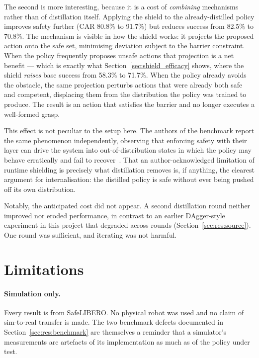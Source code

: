 \documentclass[a4paper,11pt]{report}
\begin{document}
The second is more interesting, because it is a cost of \emph{combining} mechanisms rather than of
distillation itself. Applying the shield to the already-distilled policy improves safety further
(CAR 80.8\% to 91.7\%) but reduces success from 82.5\% to 70.8\%. The mechanism is visible in how
the shield works: it projects the proposed action onto the safe set, minimising deviation subject
to the barrier constraint. When the policy frequently proposes unsafe actions that projection is a
net benefit --- which is exactly what Section~\ref{sec:shield_efficacy} shows, where the shield
\emph{raises} base success from 58.3\% to 71.7\%. When the policy already avoids the obstacle, the
same projection perturbs actions that were already both safe and competent, displacing them from
the distribution the policy was trained to produce. The result is an action that satisfies the
barrier and no longer executes a well-formed grasp.

This effect is not peculiar to the setup here. The authors of the benchmark report the same
phenomenon independently, observing that enforcing safety with their layer can drive the system
into out-of-distribution states in which the policy may behave erratically and fail to
recover~\cite{vlsa2026}. That an author-acknowledged limitation of runtime shielding is precisely
what distillation removes is, if anything, the clearest argument for internalisation: the distilled
policy is safe without ever being pushed off its own distribution.

Notably, the anticipated cost did not appear. A second distillation round neither improved nor
eroded performance, in contrast to an earlier DAgger-style experiment in this project that degraded
across rounds (Section~\ref{sec:res:source}). One round was sufficient, and iterating was not
harmful.

\section{Limitations}\label{sec:disc:limitations}

\paragraph{Simulation only.}
Every result is from SafeLIBERO. No physical robot was used and no claim of sim-to-real transfer is
made. The two benchmark defects documented in Section~\ref{sec:res:benchmark} are themselves a
reminder that a simulator's measurements are artefacts of its implementation as much as of the
policy under test.
\end{document}
